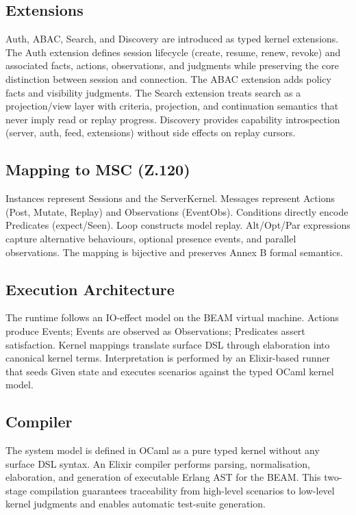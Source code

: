 \documentclass{article}
\begin{document}
\subsection{Extensions}
Auth, ABAC, Search, and Discovery are introduced as typed kernel extensions.
The Auth extension defines session lifecycle (create, resume, renew, revoke) and associated
facts, actions, observations, and judgments while preserving the core distinction between session and connection.
The ABAC extension adds policy facts and visibility judgments. The Search extension treats search as a
projection/view layer with criteria, projection, and continuation semantics that never imply read or replay progress.
Discovery provides capability introspection (server, auth, feed, extensions) without side effects on replay cursors.

\subsection{Mapping to MSC (Z.120)}
Instances represent Sessions and the ServerKernel.
Messages represent Actions (Post, Mutate, Replay) and Observations (EventObs).
Conditions directly encode Predicates (expect/Seen). Loop constructs model replay.
Alt/Opt/Par expressions capture alternative behaviours, optional presence events, and parallel observations.
The mapping is bijective and preserves Annex B formal semantics.

\subsection{Execution Architecture}
The runtime follows an IO-effect model on the BEAM virtual machine. Actions produce Events; Events are observed as Observations; Predicates assert satisfaction. Kernel mappings translate surface DSL through elaboration into canonical kernel terms. Interpretation is performed by an Elixir-based runner that seeds Given state and executes scenarios against the typed OCaml kernel model.

\subsection{Compiler}
The system model is defined in OCaml as a pure typed kernel without any surface DSL syntax. An Elixir compiler performs parsing, normalisation, elaboration, and generation of executable Erlang AST for the BEAM. This two-stage compilation guarantees traceability from high-level scenarios to low-level kernel judgments and enables automatic test-suite generation.
\end{document}
